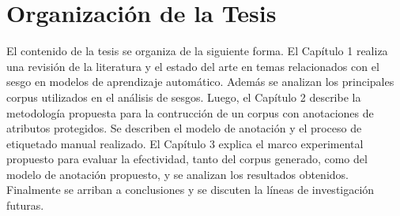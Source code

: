 \section*{Organizaci\'on de la Tesis}
El contenido de la tesis se organiza de la siguiente forma. El Cap\'itulo 1 realiza una revisi\'on de la literatura y el estado del arte en temas relacionados con el sesgo en modelos de aprendizaje autom\'atico. Adem\'as se analizan los principales corpus utilizados en el an\'alisis de sesgos. Luego, el Cap\'itulo 2 describe la metodolog\'ia propuesta para la contrucci\'on de un corpus con anotaciones de atributos protegidos. Se describen el modelo de anotaci\'on y el proceso de etiquetado manual realizado. El Cap\'itulo 3 explica el marco experimental propuesto para evaluar la efectividad, tanto del corpus generado, como del modelo de anotaci\'on propuesto, y se analizan los resultados obtenidos. Finalmente se arriban a conclusiones y se discuten la l\'ineas de investigaci\'on futuras.  